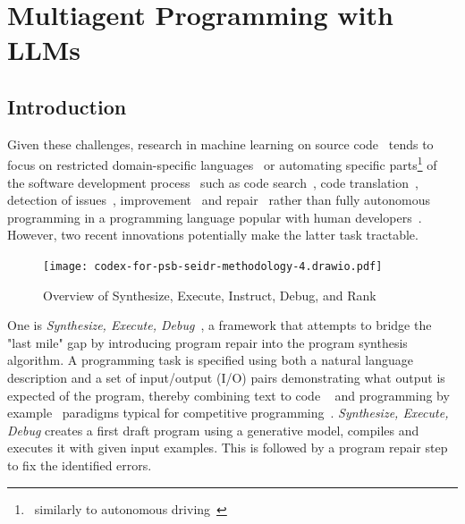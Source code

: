 \chapter{Multiagent Programming with LLMs}\label{ch:seidr}
\newcommand{\smalltt}[1]{\texttt{\small#1}}

\section{Introduction}
\label{sec:seidr-intro}



Given these challenges, research in machine learning on source code~\cite{allamanis2018:survey} tends to focus on restricted domain-specific languages~\cite{chen2021:latent,flashmeta,liventsev2021:bf} or automating specific parts\footnote{~similarly to autonomous driving~\cite{grigorescu2020:survey,marcano2020:review}} of the software development process~\cite{lu2021:codexglue,niu2023:crosscodebench} such as code search~\cite{husain2020:codesearchnet}, code translation~\cite{roziere2020:unsupervised}, detection of issues~\cite{fernandes2016:reviewbased,chakraborty2021:deep}, improvement~\cite{petke2018:genetic} and repair~\cite{gouesAutomatedProgramRepair2019} rather than fully autonomous programming in a programming language popular with human developers~\cite{:tiobe}.
However, two recent innovations potentially make the latter task tractable.

\begin{figure}
    \centering
    \texttt{[image: codex-for-psb-seidr-methodology-4.drawio.pdf]}
    \caption{Overview of Synthesize, Execute, Instruct, Debug, and Rank}
    \label{fig:method}
\end{figure}

One is \emph{Synthesize, Execute, Debug}~\cite{guptaSynthesizeExecuteDebug2020}, a framework that attempts to bridge the "last mile" gap by introducing program repair into the program synthesis algorithm. 
A programming task is specified using both a natural language description and a set of input/output (I/O) pairs demonstrating what output is expected of the program, thereby combining text to code ~\cite{iyer2018:mapping} and programming by example~\cite{halbertProgrammingExample1984,gulwani2016:programming} paradigms typical for competitive programming~\cite{zavershynskyi2018:naps}.
\emph{Synthesize, Execute, Debug} creates a first draft program using a generative model, compiles and executes it with given input examples.
This is followed by a program repair step to fix the identified errors.

